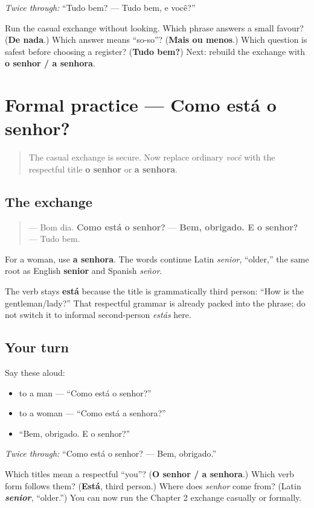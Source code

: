 \emph{Twice through:} “Tudo bem? — Tudo bem, e você?”

\begin{tcolorbox}[breakable,colback=teal!4,colframe=teal!35!black,title={Before you move on}]
Run the casual exchange without looking. Which phrase answers a small favour? (\textbf{De nada}.) Which answer means “so-so”? (\textbf{Mais ou menos}.) Which question is safest before choosing a register? (\textbf{Tudo bem?}) Next: rebuild the exchange with \textbf{o senhor / a senhora}.
\end{tcolorbox}
\section[Practice]{Formal practice — Como está o senhor?}

\label{lesson:PT-C02-formal-practice}



\begin{quote}
The casual exchange is secure. Now replace ordinary \emph{você} with the respectful title \textbf{o senhor} or \textbf{a senhora}.
\end{quote}

\subsection*{The exchange}
\begin{quote}
— Bom dia. \textbf{Como está o senhor?} — \textbf{Bem, obrigado. E o senhor?} — Tudo bem.
\end{quote}

For a woman, use \textbf{a senhora}. The words continue Latin \emph{senior}, “older,” the same root as English \textbf{senior} and Spanish \emph{señor}.

The verb stays \textbf{está} because the title is grammatically third person: “How is the gentleman/lady?” That respectful grammar is already packed into the phrase; do not switch it to informal second-person \emph{estás} here.

\subsection*{Your turn}
Say these aloud:

\begin{itemize}
\raggedright
  \item to a man — “Como está o senhor?”
  \item to a woman — “Como está a senhora?”
  \item “Bem, obrigado. E o senhor?”
\end{itemize}

\emph{Twice through:} “Como está o senhor? — Bem, obrigado.”

\begin{tcolorbox}[breakable,colback=teal!4,colframe=teal!35!black,title={Before you move on}]
Which titles mean a respectful “you”? (\textbf{O senhor / a senhora}.) Which verb form follows them? (\textbf{Está}, third person.) Where does \emph{senhor} come from? (Latin \emph{\textbf{senior}}, “older.”) You can now run the Chapter 2 exchange casually or formally.
\end{tcolorbox}
